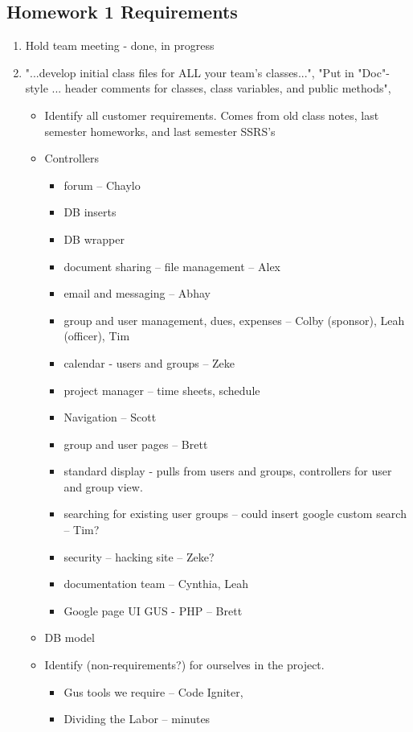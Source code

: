\documentclass[12pt]{article}
\begin{document}
\subsection{Homework 1 Requirements}
 \begin{enumerate}
 \item Hold team meeting - done, in progress
 \item "...develop initial class files for ALL your team's classes...", "Put in "Doc"-style ... header comments for classes, class variables, and public methods",
 \begin{itemize}
  \item Identify all customer requirements. Comes from old class notes, last semester homeworks, and last semester SSRS's
  \item Controllers
  \begin{itemize}
   \item forum -- Chaylo
   \item DB inserts
   \item DB wrapper
  \item document sharing -- file management -- Alex
  \item email and messaging -- Abhay
  \item group and user management, dues, expenses -- Colby (sponsor), Leah (officer), Tim
  \item calendar - users and groups -- Zeke
  \item project manager -- time sheets, schedule
  \item Navigation -- Scott
  \item group and user pages -- Brett
  \item standard display - pulls from users and groups, controllers for user and group view.
  \item searching for existing user groups -- could insert google custom search -- Tim?
  \item security -- hacking site -- Zeke?
  \item documentation team -- Cynthia, Leah
  \item Google page UI GUS - PHP -- Brett
 \end{itemize}
 \item DB model
  \item Identify (non-requirements?) for ourselves in the project.
   \begin{itemize}
    \item Gus tools we require -- Code Igniter,
    \item Dividing the Labor -- minutes

\end{itemize}
\end{itemize}
\end{enumerate}
\end{document}
